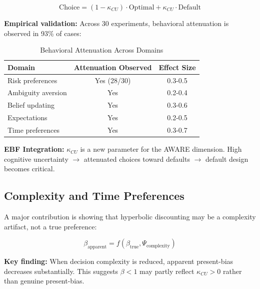 \begin{equation}
\text{Choice} = (1 - \kappa_{CU}) \cdot \text{Optimal} + \kappa_{CU} \cdot \text{Default}
\label{eq:enk-cu}
\end{equation}

\textbf{Empirical validation:} Across 30 experiments, behavioral attenuation
is observed in 93\% of cases:

\begin{table}[htbp]
\centering
\caption{Behavioral Attenuation Across Domains}
\label{tab:enk-attenuation}
\begin{tabular}{@{}lcc@{}}
\toprule
\textbf{Domain} & \textbf{Attenuation Observed} & \textbf{Effect Size} \\
\midrule
Risk preferences & Yes (28/30) & 0.3-0.5 \\
Ambiguity aversion & Yes & 0.2-0.4 \\
Belief updating & Yes & 0.3-0.6 \\
Expectations & Yes & 0.2-0.5 \\
Time preferences & Yes & 0.3-0.7 \\
\bottomrule
\end{tabular}
\end{table}

\textbf{EBF Integration:} $\kappa_{CU}$ is a new parameter for the AWARE
dimension. High cognitive uncertainty $\rightarrow$ attenuated choices toward
defaults $\rightarrow$ default design becomes critical.

\subsection{Complexity and Time Preferences}
\label{sec:enk-complexity}

A major contribution is showing that hyperbolic discounting may be a
complexity artifact, not a true preference:

\begin{equation}
\beta_{\text{apparent}} = f(\beta_{\text{true}}, \Psi_{\text{complexity}})
\end{equation}

\textbf{Key finding:} When decision complexity is reduced, apparent
present-bias decreases substantially. This suggests $\beta < 1$ may partly
reflect $\kappa_{CU} > 0$ rather than genuine present-bias.

